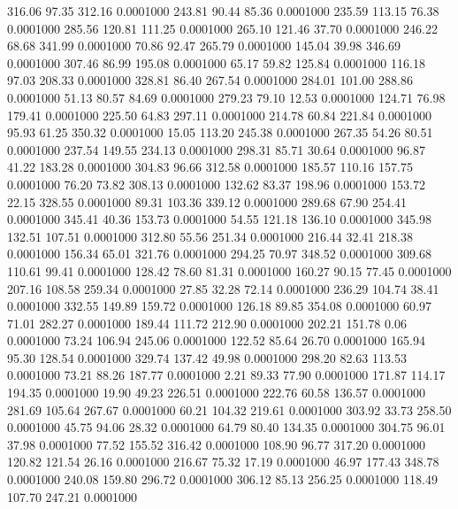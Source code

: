  316.06   97.35  312.16   0.0001000
 243.81   90.44   85.36   0.0001000
 235.59  113.15   76.38   0.0001000
 285.56  120.81  111.25   0.0001000
 265.10  121.46   37.70   0.0001000
 246.22   68.68  341.99   0.0001000
  70.86   92.47  265.79   0.0001000
 145.04   39.98  346.69   0.0001000
 307.46   86.99  195.08   0.0001000
  65.17   59.82  125.84   0.0001000
 116.18   97.03  208.33   0.0001000
 328.81   86.40  267.54   0.0001000
 284.01  101.00  288.86   0.0001000
  51.13   80.57   84.69   0.0001000
 279.23   79.10   12.53   0.0001000
 124.71   76.98  179.41   0.0001000
 225.50   64.83  297.11   0.0001000
 214.78   60.84  221.84   0.0001000
  95.93   61.25  350.32   0.0001000
  15.05  113.20  245.38   0.0001000
 267.35   54.26   80.51   0.0001000
 237.54  149.55  234.13   0.0001000
 298.31   85.71   30.64   0.0001000
  96.87   41.22  183.28   0.0001000
 304.83   96.66  312.58   0.0001000
 185.57  110.16  157.75   0.0001000
  76.20   73.82  308.13   0.0001000
 132.62   83.37  198.96   0.0001000
 153.72   22.15  328.55   0.0001000
  89.31  103.36  339.12   0.0001000
 289.68   67.90  254.41   0.0001000
 345.41   40.36  153.73   0.0001000
  54.55  121.18  136.10   0.0001000
 345.98  132.51  107.51   0.0001000
 312.80   55.56  251.34   0.0001000
 216.44   32.41  218.38   0.0001000
 156.34   65.01  321.76   0.0001000
 294.25   70.97  348.52   0.0001000
 309.68  110.61   99.41   0.0001000
 128.42   78.60   81.31   0.0001000
 160.27   90.15   77.45   0.0001000
 207.16  108.58  259.34   0.0001000
  27.85   32.28   72.14   0.0001000
 236.29  104.74   38.41   0.0001000
 332.55  149.89  159.72   0.0001000
 126.18   89.85  354.08   0.0001000
  60.97   71.01  282.27   0.0001000
 189.44  111.72  212.90   0.0001000
 202.21  151.78    0.06   0.0001000
  73.24  106.94  245.06   0.0001000
 122.52   85.64   26.70   0.0001000
 165.94   95.30  128.54   0.0001000
 329.74  137.42   49.98   0.0001000
 298.20   82.63  113.53   0.0001000
  73.21   88.26  187.77   0.0001000
   2.21   89.33   77.90   0.0001000
 171.87  114.17  194.35   0.0001000
  19.90   49.23  226.51   0.0001000
 222.76   60.58  136.57   0.0001000
 281.69  105.64  267.67   0.0001000
  60.21  104.32  219.61   0.0001000
 303.92   33.73  258.50   0.0001000
  45.75   94.06   28.32   0.0001000
  64.79   80.40  134.35   0.0001000
 304.75   96.01   37.98   0.0001000
  77.52  155.52  316.42   0.0001000
 108.90   96.77  317.20   0.0001000
 120.82  121.54   26.16   0.0001000
 216.67   75.32   17.19   0.0001000
  46.97  177.43  348.78   0.0001000
 240.08  159.80  296.72   0.0001000
 306.12   85.13  256.25   0.0001000
 118.49  107.70  247.21   0.0001000
